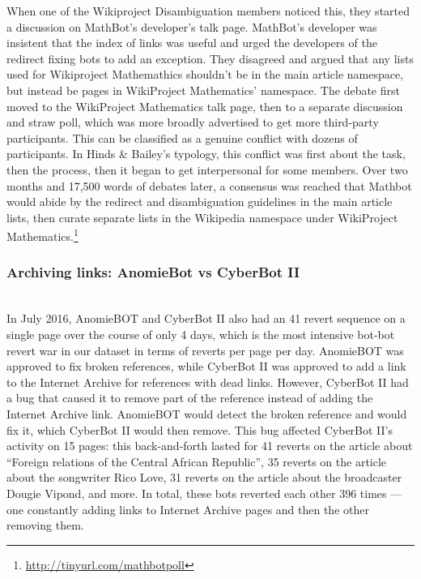 \documentclass[format=acmsmall, review=false, screen=true]{acmart}%
\begin{document}
When one of the Wikiproject Disambiguation members noticed this, they started a discussion on MathBot's developer's talk page. MathBot's developer was insistent that the index of links was useful and urged the developers of the redirect fixing bots to add an exception. They disagreed and argued that any lists used for Wikiproject Mathemathics shouldn't be in the main article namespace, but instead be pages in WikiProject Mathematics' namespace. The debate first moved to the WikiProject Mathematics talk page, then to a separate discussion and straw poll, which was more broadly advertised to get more third-party participants. This can be classified as a genuine conflict with dozens of participants. In Hinds \& Bailey's typology, this conflict was first about the task, then the process, then it began to get interpersonal for some members. Over two months and 17,500 words of debates later, a consensus was reached that Mathbot would abide by the redirect and disambiguation guidelines in the main article lists, then curate separate lists in the Wikipedia namespace under WikiProject Mathematics.\footnote{ \url{http://tinyurl.com/mathbotpoll} }  

\subsubsection{Archiving links: AnomieBot vs CyberBot II}  \label{s:qualdesc:anomiebot}
~\\
In July 2016, AnomieBOT and CyberBot II also had an 41 revert sequence on a single page over the course of only 4 days, which is the most intensive bot-bot revert war in our dataset in terms of reverts per page per day. AnomieBOT was approved to fix broken references, while CyberBot II was approved to add a link to the Internet Archive for references with dead links. However, CyberBot II had a bug that caused it to remove part of the reference instead of adding the Internet Archive link. AnomieBOT would detect the broken reference and would fix it, which CyberBot II would then remove. This bug affected CyberBot II's activity on 15 pages: this back-and-forth lasted for 41 reverts on the article about ``Foreign relations of the Central African Republic'', 35 reverts on the article about the songwriter Rico Love, 31 reverts on the article about the broadcaster Dougie Vipond, and more. In total, these bots reverted each other 396 times --- one constantly adding links to Internet Archive pages and then the other removing them. 
\end{document}
